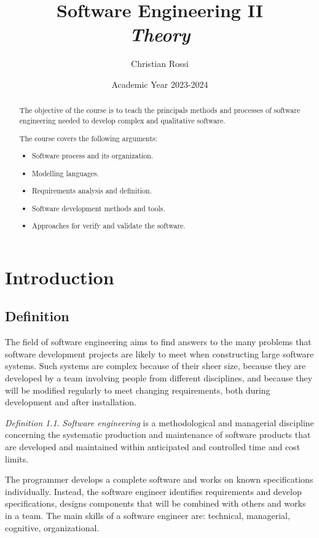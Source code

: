 \documentclass[12pt, a4paper]{report}
\title{Software Engineering II \\ \textit{Theory}}
\author{Christian Rossi}
\date{Academic Year 2023-2024}
\theoremstyle{remark}
\newtheorem*{remark}{Definition}
\begin{document}
\maketitle

\newpage

\begin{abstract}
    The objective of the course is to teach the principals methods and processes of software engineering needed to develop complex and qualitative software.
    \par
    The course covers the following arguments:
    \begin{itemize}
        \item Software process and its organization.
        \item Modelling languages.
        \item Requirements analysis and definition.
        \item Software development methods and tools.
        \item Approaches for verify and validate the software.
    \end{itemize}
\end{abstract}

\newpage

\tableofcontents

\newpage

\chapter{Introduction}
\section{Definition}
    The field of software engineering aims to find answers to the many problems that software development projects are likely
    to meet when constructing large software systems. Such systems are complex because of their sheer size, because they are 
    developed by a team involving people from different disciplines, and because they will be modified regularly to meet 
    changing requirements, both during development and after installation. 
    \begin{remark}
        \emph{Software engineering} is a methodological and managerial discipline concerning the systematic production and 
        maintenance of software products that are developed and maintained within anticipated and controlled time and cost limits.
    \end{remark}
    \par
    The programmer develops a complete software and works on known specifications individually. Instead, the software engineer 
    identifies requirements and develop specifications, designs components that will be combined with others and works in a team.
    The main skills of a software engineer are: technical, managerial, cognitive, organizational.
\end{document}
